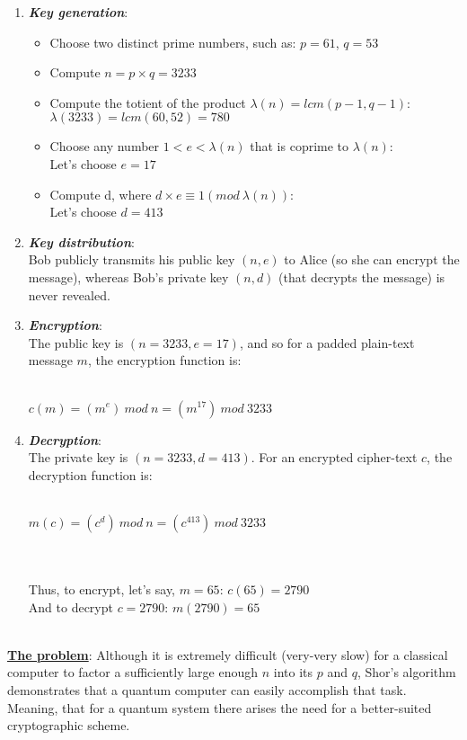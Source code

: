 \begin{enumerate}
    \item \textbf{\textit{Key generation}}:
        \begin{itemize}
            \item Choose two distinct prime numbers, such as: $p = 61$, $q = 53$
            \item Compute $n = p \times q = 3233$
            \item Compute the totient of the product $\lambda(n) = lcm(p - 1, q - 1)$:\\
                $\lambda(3233) = lcm(60, 52) = 780$
            \item Choose any number $1 < e < \lambda(n)$ that is coprime to $\lambda(n)$:\\
                  Let's choose $e = 17$
            \item Compute d, where $d \times e \equiv 1 (mod\ \lambda(n))$:\\
                  Let’s choose $d = 413$
        \end{itemize}

    \item \textbf{\textit{Key distribution}}:\\
        Bob publicly transmits his public key $(n, e)$ to Alice (so she can encrypt the message), whereas Bob's private key
        $(n, d)$ (that decrypts the message) is never revealed.
    \item \textbf{\textit{Encryption}}:\\
        The public key is $(n = 3233, e = 17)$, and so for a padded plain-text message $m$, the encryption function is:~\\~\\
        \centerline{$c(m) = (m^e)\ mod\ n = (m^{17})\ mod\ 3233$}
    \item \textbf{\textit{Decryption}}:\\
        The private key is $(n = 3233, d = 413)$. For an encrypted cipher-text $c$, the decryption function is:~\\~\\
        \centerline{$m(c) = (c^d)\ mod\ n = (c^{413})\ mod\ 3233$}\\~\\
        Thus, to encrypt, let’s say, $m = 65$: $c(65) = 2790$\\
        And to decrypt $c = 2790$: $m(2790) = 65$
\end{enumerate}
~\vspace{0.25in}\\
\textbf{\underline{The problem}}: Although it is extremely difficult (very-very slow) for a classical computer to factor a sufficiently 
large enough $n$ into its $p$ and $q$, Shor's algorithm demonstrates that a quantum computer can easily accomplish that task. 
Meaning, that for a quantum system there arises the need for a better-suited cryptographic scheme.
